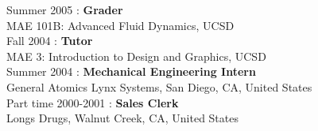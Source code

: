 \documentclass[12pt]{article}
\begin{document}

\noindent Summer 2005 : \textbf{Grader}\\
 MAE 101B: Advanced Fluid Dynamics, UCSD\\

\noindent Fall 2004 : \textbf{Tutor}\\
 MAE 3: Introduction to Design and Graphics, UCSD\\

\noindent Summer 2004 : \textbf{Mechanical Engineering Intern}\\
General Atomics Lynx Systems, San Diego, CA, United States\\


\noindent Part time 2000-2001 : \textbf{Sales Clerk}\\
Longs Drugs, Walnut Creek, CA, United States\\

\thispagestyle{lastpagestyle}


\end{document}
